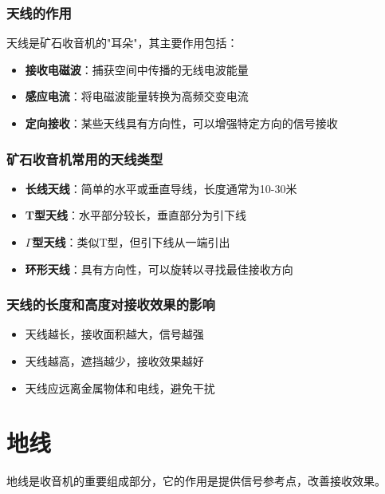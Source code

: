 \documentclass[12pt,UTF8]{ctexbook}
\begin{document}
   \subsubsection{天线的作用}

   天线是矿石收音机的"耳朵"，其主要作用包括：

   \begin{itemize}[leftmargin=3.5em]
       \item \textbf{接收电磁波}：捕获空间中传播的无线电波能量
       \item \textbf{感应电流}：将电磁波能量转换为高频交变电流
       \item \textbf{定向接收}：某些天线具有方向性，可以增强特定方向的信号接收
   \end{itemize}

   \subsubsection{矿石收音机常用的天线类型}

   \begin{itemize}[leftmargin=3.5em]
       \item \textbf{长线天线}：简单的水平或垂直导线，长度通常为10-30米
       \item \textbf{T型天线}：水平部分较长，垂直部分为引下线
       \item \textbf{$\Gamma$型天线}：类似T型，但引下线从一端引出
       \item \textbf{环形天线}：具有方向性，可以旋转以寻找最佳接收方向
   \end{itemize}

   \subsubsection{天线的长度和高度对接收效果的影响}

   \begin{itemize}[leftmargin=3.5em]
       \item 天线越长，接收面积越大，信号越强
       \item 天线越高，遮挡越少，接收效果越好
       \item 天线应远离金属物体和电线，避免干扰
   \end{itemize}

\section{地线}

地线是收音机的重要组成部分，它的作用是提供信号参考点，改善接收效果。
\end{document}
